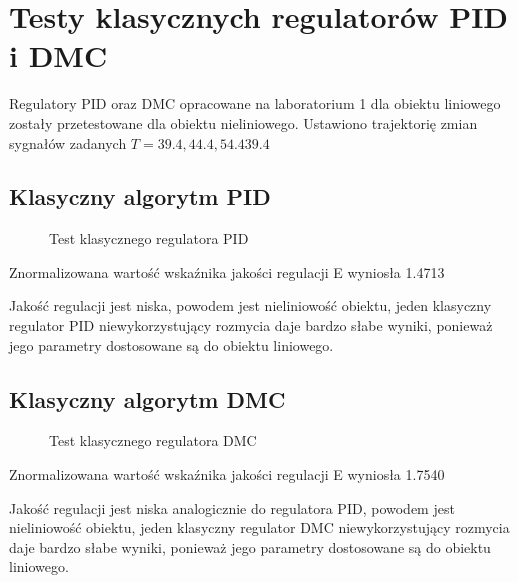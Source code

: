 \section{Testy klasycznych regulatorów PID i DMC}
\label{lab:zad3}

Regulatory PID oraz DMC opracowane na laboratorium 1 dla obiektu liniowego
zostały przetestowane dla obiektu nieliniowego. Ustawiono trajektorię zmian
sygnałów zadanych $T= 39.4, 44.4, 54.4 39.4$


\subsection{Klasyczny algorytm PID}
\label{lab:zad3:PID}

\begin{figure}[H] 
   \centering
   
   \caption{Test klasycznego regulatora PID}
   \label{lab:zad3:PID:figure}
\end{figure}

Znormalizowana wartość wskaźnika jakości regulacji E wyniosła \num{1.4713}

Jakość regulacji jest niska, powodem jest nieliniowość obiektu, jeden klasyczny
regulator PID niewykorzystujący rozmycia daje bardzo słabe wyniki, ponieważ jego
parametry dostosowane są do obiektu liniowego.

\newpage

\subsection{Klasyczny algorytm DMC}
\label{lab:zad3:DMC}

\begin{figure}[H] 
    \centering
    
    \caption{Test klasycznego regulatora DMC}
    \label{lab:zad3:DMC:figure}
\end{figure}

Znormalizowana wartość wskaźnika jakości regulacji E wyniosła \num{1.7540}

Jakość regulacji jest niska analogicznie do regulatora PID, powodem jest nieliniowość
obiektu, jeden klasyczny regulator DMC niewykorzystujący rozmycia daje bardzo słabe
wyniki, ponieważ jego parametry dostosowane są do obiektu liniowego.

\newpage

